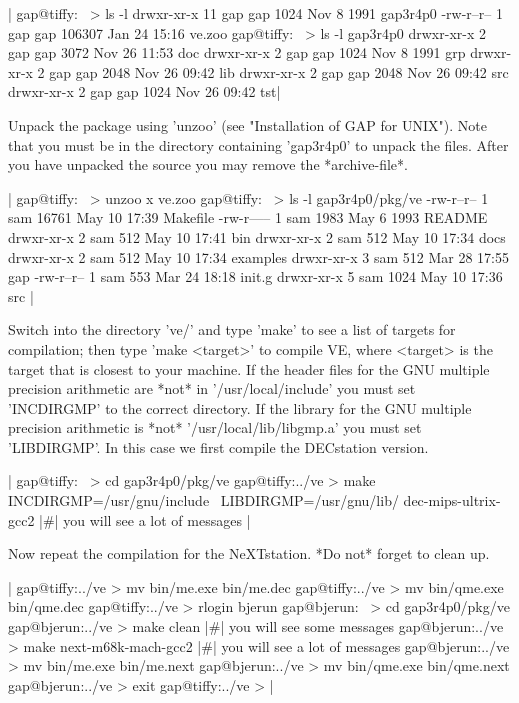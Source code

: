 |    gap@tiffy:~ > ls -l
    drwxr-xr-x  11 gap      gap          1024 Nov  8  1991 gap3r4p0
    -rw-r--r--   1 gap      gap        106307 Jan 24 15:16 ve.zoo
    gap@tiffy:~ > ls -l gap3r4p0
    drwxr-xr-x   2 gap      gap          3072 Nov 26 11:53 doc
    drwxr-xr-x   2 gap      gap          1024 Nov  8  1991 grp
    drwxr-xr-x   2 gap      gap          2048 Nov 26 09:42 lib
    drwxr-xr-x   2 gap      gap          2048 Nov 26 09:42 src
    drwxr-xr-x   2 gap      gap          1024 Nov 26 09:42 tst|

Unpack the package using 'unzoo'  (see  "Installation of GAP for  UNIX").
Note  that you must  be in the  directory containing 'gap3r4p0' to unpack
the files.  After   you have  unpacked the source   you   may remove  the
*archive-file*.

|    gap@tiffy:~ > unzoo x ve.zoo
     gap@tiffy:~ > ls -l gap3r4p0/pkg/ve
     -rw-r--r--  1 sam         16761 May 10 17:39 Makefile
     -rw-r-----  1 sam          1983 May  6  1993 README
     drwxr-xr-x  2 sam           512 May 10 17:41 bin
     drwxr-xr-x  2 sam           512 May 10 17:34 docs
     drwxr-xr-x  2 sam           512 May 10 17:34 examples
     drwxr-xr-x  3 sam           512 Mar 28 17:55 gap
     -rw-r--r--  1 sam           553 Mar 24 18:18 init.g
     drwxr-xr-x  5 sam          1024 May 10 17:36 src |

Switch into the directory 've/' and type 'make' to see a list of targets
for compilation; then type 'make <target>' to compile VE, where <target>
is the target that is closest to your machine.  If the header files for
the GNU multiple precision arithmetic are *not* in '/usr/local/include'
you must set 'INCDIRGMP' to the correct directory.  If the library for
the GNU multiple precision arithmetic is *not* '/usr/local/lib/libgmp.a'
you must set 'LIBDIRGMP'.  In this case we first compile the
DECstation version.

|    gap@tiffy:~ > cd gap3r4p0/pkg/ve
    gap@tiffy:../ve > make INCDIRGMP=/usr/gnu/include \
                       LIBDIRGMP=/usr/gnu/lib/ dec-mips-ultrix-gcc2
    |\#| you will see a lot of messages |

Now repeat the compilation  for the NeXTstation. *Do not* forget to clean
up.

|    gap@tiffy:../ve > mv bin/me.exe bin/me.dec
    gap@tiffy:../ve > mv bin/qme.exe bin/qme.dec
    gap@tiffy:../ve > rlogin bjerun
    gap@bjerun:~ > cd gap3r4p0/pkg/ve
    gap@bjerun:../ve > make clean
    |\#| you will see some messages
    gap@bjerun:../ve > make next-m68k-mach-gcc2
    |\#| you will see a lot of messages
    gap@bjerun:../ve > mv bin/me.exe bin/me.next
    gap@bjerun:../ve > mv bin/qme.exe bin/qme.next
    gap@bjerun:../ve > exit
    gap@tiffy:../ve > |

